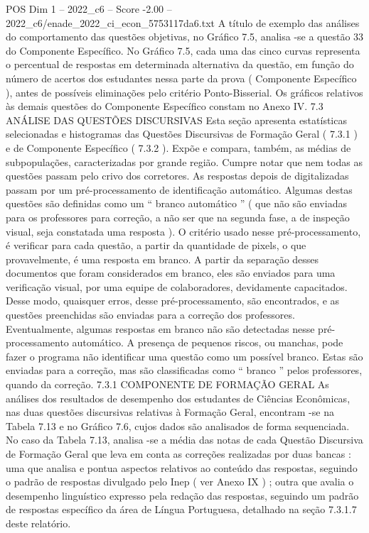 \begin{textsample}{POS Dim 1 – 2022\_c6 – Score -2.00 – 2022\_c6/enade\_2022\_ci\_econ\_5753117da6.txt}
A título de exemplo das análises do comportamento das questões objetivas, no Gráfico 7.5, analisa -se a questão 33 do Componente Específico.
No Gráfico 7.5, cada uma das cinco curvas representa o percentual de respostas em determinada alternativa da questão, em função do número de acertos dos estudantes nessa parte da prova ( Componente Específico ), antes de possíveis eliminações pelo critério Ponto-Bisserial.
Os gráficos relativos às demais questões do Componente Específico constam no Anexo IV. 7.3 ANÁLISE DAS QUESTÕES DISCURSIVAS Esta seção apresenta estatísticas selecionadas e histogramas das Questões Discursivas de Formação Geral ( 7.3.1 ) e de Componente Específico ( 7.3.2 ).
Expõe e compara, também, as médias de subpopulações, caracterizadas por grande região.
Cumpre notar que nem todas as questões passam pelo crivo dos corretores.
As respostas depois de digitalizadas passam por um pré-processamento de identificação automático.
Algumas destas questões são definidas como um “ branco automático ” ( que não são enviadas para os professores para correção, a não ser que na segunda fase, a de inspeção visual, seja constatada uma resposta ).
O critério usado nesse pré-processamento, é verificar para cada questão, a partir da quantidade de pixels, o que provavelmente, é uma resposta em branco.
A partir da separação desses documentos que foram considerados em branco, eles são enviados para uma verificação visual, por uma equipe de colaboradores, devidamente capacitados.
Desse modo, quaisquer erros, desse pré-processamento, são encontrados, e as questões preenchidas são enviadas para a correção dos professores.
Eventualmente, algumas respostas em branco não são detectadas nesse pré-processamento automático.
A presença de pequenos riscos, ou manchas, pode fazer o programa não identificar uma questão como um possível branco.
Estas são enviadas para a correção, mas são classificadas como “ branco ” pelos professores, quando da correção. 7.3.1 COMPONENTE DE FORMAÇÃO GERAL As análises dos resultados de desempenho dos estudantes de Ciências Econômicas, nas duas questões discursivas relativas à Formação Geral, encontram -se na Tabela 7.13 e no Gráfico 7.6, cujos dados são analisados de forma sequenciada.
No caso da Tabela 7.13, analisa -se a média das notas de cada Questão Discursiva de Formação Geral que leva em conta as correções realizadas por duas bancas : uma que analisa e pontua aspectos relativos ao conteúdo das respostas, seguindo o padrão de respostas divulgado pelo Inep ( ver Anexo IX ) ; outra que avalia o desempenho linguístico expresso pela redação das respostas, seguindo um padrão de respostas específico da área de Língua Portuguesa, detalhado na seção 7.3.1.7 deste relatório.

\end{textsample}
